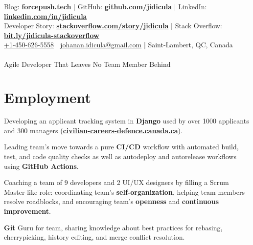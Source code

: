 \documentclass[]{jidicula-resume}
\begin{document}
\livelocation\hfill\lastupdated

{ Blog: \href{http://bit.ly/jidicula-site}{\bf forcepush.tech}
  | GitHub: \href{http://bit.ly/jidicula_github}{\bf github.com/jidicula} | LinkedIn: \href{https://bit.ly/jidicula-linkedin}{\bf linkedin.com/in/jidicula} \\
  Developer Story: \href{https://stackoverflow.com/story/jidicula}{\bf stackoverflow.com/story/jidicula} | Stack Overflow: \href{https://bit.ly/jidicula-stackoverflow}{\bf bit.ly/jidicula-stackoverflow} \\
  \href{tel:14506265558}{+1-450-626-5558}
  | \href{mailto:johanan.idicula+resume@gmail.com}{johanan.idicula@gmail.com}
  | Saint-Lambert, QC, Canada \\~\\
{\Large Agile Developer That Leaves No Team Member Behind}
}

\section{Employment}

\vspace{\topsep} %
\begin{tightemize}
\item Developing an applicant tracking system in \textbf{Django} used by over 1000 applicants and 300 managers (\href{https://civilian-careers-defence.canada.ca}{\bf civilian-careers-defence.canada.ca}).
\item Leading team's move towards a pure \textbf{CI/CD} workflow with automated build, test, and code quality checks as well as autodeploy and autorelease workflows using \textbf{GitHub Actions}.
\item Coaching a team of 9 developers and 2 UI/UX designers by filling a Scrum Master-like role: coordinating team's \textbf{self-organization}, helping team members resolve roadblocks, and encouraging team's \textbf{openness} and \textbf{continuous improvement}.
\item \textbf{Git} Guru for team, sharing knowledge about best practices for rebasing, cherrypicking, history editing, and merge conflict resolution.
\end{tightemize}
\sectionsep{}
\end{document}

